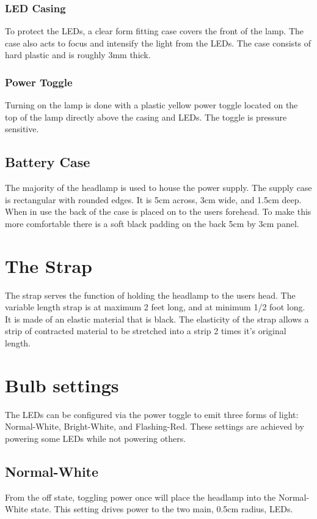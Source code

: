 \documentclass[12pt]{article}
\begin{document}
\subsubsection{LED Casing}
To protect the LEDs, a clear form fitting case covers the front of the lamp.  The case also acts to
focus and intensify the light from the LEDs. The case consists of hard plastic and is roughly
3mm thick.

\subsubsection{Power Toggle}
Turning on the lamp is done with a plastic yellow power toggle located on the top of the lamp
directly above the casing and LEDs. The toggle is pressure sensitive.

\subsection{Battery Case}
The majority of the headlamp is used to house the power supply. The supply case is rectangular with
rounded edges. It is 5cm across, 3cm wide, and 1.5cm deep. When in use the back of the case is
placed on to the users forehead. To make this more comfortable there is a soft black padding on the
back 5cm by 3cm panel.

\section{The Strap}
The strap serves the function of holding the headlamp to the users head. The variable length strap
is at maximum 2 feet long, and at minimum 1/2 foot long. It is made of an elastic material that
is black. The elasticity of the strap allows a strip of contracted material to be stretched into a
strip 2 times it's original length.

\section{Bulb settings}
The LEDs can be configured via the power toggle to emit three forms of light: Normal-White,
Bright-White, and Flashing-Red. These settings are achieved by powering some LEDs while not
powering others.

\subsection{Normal-White}
From the off state, toggling power once will place the headlamp into the Normal-White state.  This
setting drives power to the two main, 0.5cm radius, LEDs.
\end{document}
